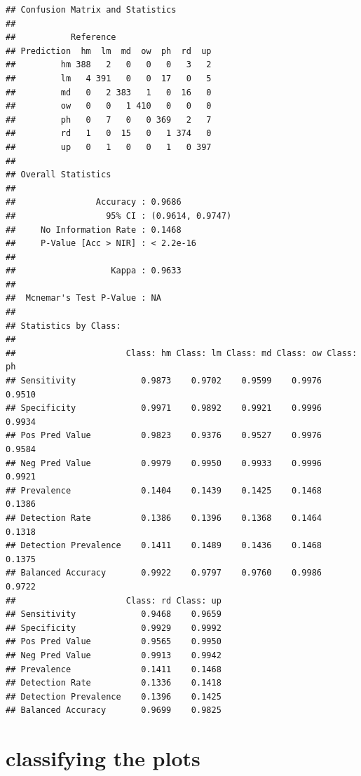 \documentclass[
]{article}
\newenvironment{Shaded}{\begin{snugshade}}{\end{snugshade}}
\newcommand{\CommentTok}[1]{\textcolor[rgb]{0.56,0.35,0.01}{\textit{#1}}}
\newcommand{\FunctionTok}[1]{\textcolor[rgb]{0.13,0.29,0.53}{\textbf{#1}}}
\newcommand{\NormalTok}[1]{#1}
\newcommand{\SpecialCharTok}[1]{\textcolor[rgb]{0.81,0.36,0.00}{\textbf{#1}}}
\begin{document}
\begin{Shaded}
\end{Shaded}

\begin{verbatim}
## Confusion Matrix and Statistics
## 
##           Reference
## Prediction  hm  lm  md  ow  ph  rd  up
##         hm 388   2   0   0   0   3   2
##         lm   4 391   0   0  17   0   5
##         md   0   2 383   1   0  16   0
##         ow   0   0   1 410   0   0   0
##         ph   0   7   0   0 369   2   7
##         rd   1   0  15   0   1 374   0
##         up   0   1   0   0   1   0 397
## 
## Overall Statistics
##                                           
##                Accuracy : 0.9686          
##                  95% CI : (0.9614, 0.9747)
##     No Information Rate : 0.1468          
##     P-Value [Acc > NIR] : < 2.2e-16       
##                                           
##                   Kappa : 0.9633          
##                                           
##  Mcnemar's Test P-Value : NA              
## 
## Statistics by Class:
## 
##                      Class: hm Class: lm Class: md Class: ow Class: ph
## Sensitivity             0.9873    0.9702    0.9599    0.9976    0.9510
## Specificity             0.9971    0.9892    0.9921    0.9996    0.9934
## Pos Pred Value          0.9823    0.9376    0.9527    0.9976    0.9584
## Neg Pred Value          0.9979    0.9950    0.9933    0.9996    0.9921
## Prevalence              0.1404    0.1439    0.1425    0.1468    0.1386
## Detection Rate          0.1386    0.1396    0.1368    0.1464    0.1318
## Detection Prevalence    0.1411    0.1489    0.1436    0.1468    0.1375
## Balanced Accuracy       0.9922    0.9797    0.9760    0.9986    0.9722
##                      Class: rd Class: up
## Sensitivity             0.9468    0.9659
## Specificity             0.9929    0.9992
## Pos Pred Value          0.9565    0.9950
## Neg Pred Value          0.9913    0.9942
## Prevalence              0.1411    0.1468
## Detection Rate          0.1336    0.1418
## Detection Prevalence    0.1396    0.1425
## Balanced Accuracy       0.9699    0.9825
\end{verbatim}

\section{classifying the plots}\label{classifying-the-plots-2}
\end{document}
